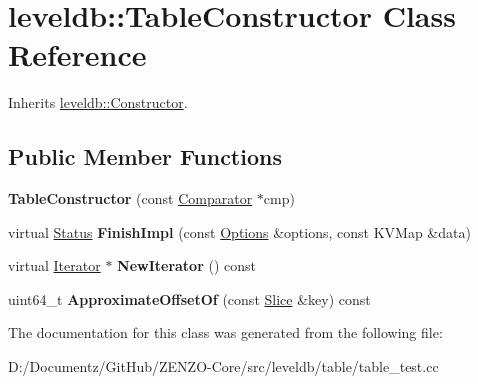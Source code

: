 \hypertarget{classleveldb_1_1_table_constructor}{}\section{leveldb\+::Table\+Constructor Class Reference}
\label{classleveldb_1_1_table_constructor}


Inherits \mbox{\hyperlink{classleveldb_1_1_constructor}{leveldb\+::\+Constructor}}.

\subsection*{Public Member Functions}
\begin{DoxyCompactItemize}
\item 
\mbox{\label{classleveldb_1_1_table_constructor_acfc791dc15a8fac77f9715fda659eb19}} 
{\bfseries Table\+Constructor} (const \mbox{\hyperlink{structleveldb_1_1_comparator}{Comparator}} $\ast$cmp)
\item 
\mbox{\label{classleveldb_1_1_table_constructor_aa8ce3799a55859c2dee50d3e08f56ef2}} 
virtual \mbox{\hyperlink{classleveldb_1_1_status}{Status}} {\bfseries Finish\+Impl} (const \mbox{\hyperlink{structleveldb_1_1_options}{Options}} \&options, const K\+V\+Map \&data)
\item 
\mbox{\label{classleveldb_1_1_table_constructor_ac01be8f3173a137d7f5c3c94ba699075}} 
virtual \mbox{\hyperlink{classleveldb_1_1_iterator}{Iterator}} $\ast$ {\bfseries New\+Iterator} () const
\item 
\mbox{\label{classleveldb_1_1_table_constructor_afceedae5bc8e477c94f1b7a3afb726a2}} 
uint64\+\_\+t {\bfseries Approximate\+Offset\+Of} (const \mbox{\hyperlink{classleveldb_1_1_slice}{Slice}} \&key) const
\end{DoxyCompactItemize}


The documentation for this class was generated from the following file\+:\begin{DoxyCompactItemize}
\item 
D\+:/\+Documentz/\+Git\+Hub/\+Z\+E\+N\+Z\+O-\/\+Core/src/leveldb/table/table\+\_\+test.\+cc\end{DoxyCompactItemize}
